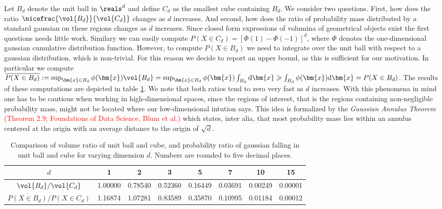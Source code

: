 Let $B_d$ denote the unit ball in $\reals^d$ and define $C_d$ as the smallest cube containing $B_d$.
We consider two questions.
First, how does the ratio $\nicefrac{\vol{B_d}}{\vol{C_d}}$ changes as $d$ increases.
And second, how does the ratio of probability mass distributed by a standard gaussian on these regions changes as $d$ increases.
Since closed form expressions of volumina of geometrical objects exist the first questions needs little work.
Similary we can easily compute $P(X \in C_d) = \left[\Phi(1) - \Phi(-1)\right]^d$, where $\Phi$ denotes the one-dimensional gaussian cumulative distribution function.
However, to compute $P(X \in B_d)$ we need to integrate over the unit ball with respect to a gaussian distribution, which is non-trivial.
For this reason we decide to report an upper bound, as this is sufficient for our motivation.
In particular we compute $\overline{P(X \in B_d)} := \sup_{\bm{x} \in B_d} \phi(\bm{x}) \vol{B_d} = \sup_{\bm{x} \in B_d} \phi(\bm{x}) \int_{B_d} \mathrm{d}\bm{x} \geqslant \int_{B_d} \phi(\bm{x}) \mathrm{d}\bm{x} = P(X \in B_d)$.
The results of these computations are depicted in table \ref{tab:vol_high_dim}.
We note that both ratios tend to zero very fast as $d$ increases.
With this phenomena in mind one has to be cautious when working in high-dimensional spaces, since the regions of interest, that is the regions containing non-negligible probability mass, might not be located where our low-dimensional intution says.
This idea is formalized by the \emph{Gaussian Annulus Theorem} \textcolor{red}{(Theorem 2.9; Foundations of Data Science, Blum et al.)} which states, inter alia, that most probability mass lies within an annulus centered at the origin with an average distance to the origin of $\sqrt{d}$.


\begin{table}[ht]
\def\arraystretch{1.3}
\centering
 \begin{tabular}{c | c c c c c c c}
 $d$ & 1 & 2 & 3 & 5 & 7 & 10 & 15\\
 \hline
 ${\vol{B_d}} / {\vol{C_d}}$ & 1.00000 & 0.78540 & 0.52360 & 0.16449 & 0.03691 & 0.00249 & 0.00001\\
 ${\overline{P(X \in B_d)}} / {P(X \in C_d)}$ & 1.16874 & 1.07281 & 0.83589 & 0.35870 & 0.10995 & 0.01184 & 0.00012
 \end{tabular}
 \caption{Comparison of volume ratio of unit ball and cube, and probability ratio of gaussian falling in unit ball and cube for varying dimension $d$. Numbers are rounded to five decimal places.}
\label{tab:vol_high_dim}
\end{table}



